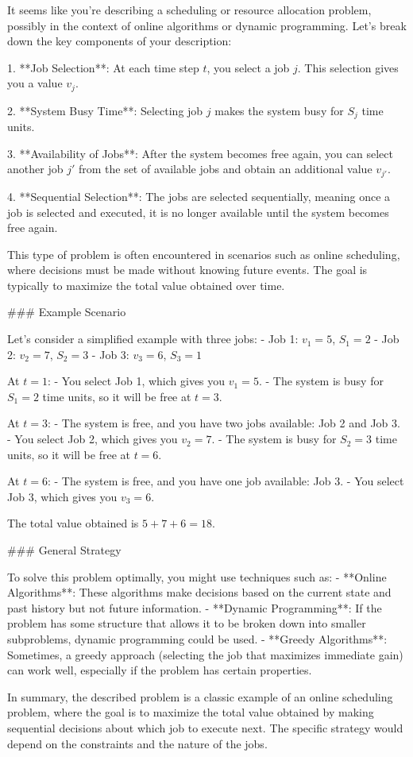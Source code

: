 It seems like you're describing a scheduling or resource allocation problem, possibly in the context of online algorithms or dynamic programming. Let's break down the key components of your description:

1. **Job Selection**: At each time step \( t \), you select a job \( j \). This selection gives you a value \( v_j \).

2. **System Busy Time**: Selecting job \( j \) makes the system busy for \( S_j \) time units.

3. **Availability of Jobs**: After the system becomes free again, you can select another job \( j' \) from the set of available jobs and obtain an additional value \( v_{j'} \).

4. **Sequential Selection**: The jobs are selected sequentially, meaning once a job is selected and executed, it is no longer available until the system becomes free again.

This type of problem is often encountered in scenarios such as online scheduling, where decisions must be made without knowing future events. The goal is typically to maximize the total value obtained over time.

### Example Scenario

Let's consider a simplified example with three jobs:
- Job 1: \( v_1 = 5 \), \( S_1 = 2 \)
- Job 2: \( v_2 = 7 \), \( S_2 = 3 \)
- Job 3: \( v_3 = 6 \), \( S_3 = 1 \)

At \( t = 1 \):
- You select Job 1, which gives you \( v_1 = 5 \).
- The system is busy for \( S_1 = 2 \) time units, so it will be free at \( t = 3 \).

At \( t = 3 \):
- The system is free, and you have two jobs available: Job 2 and Job 3.
- You select Job 2, which gives you \( v_2 = 7 \).
- The system is busy for \( S_2 = 3 \) time units, so it will be free at \( t = 6 \).

At \( t = 6 \):
- The system is free, and you have one job available: Job 3.
- You select Job 3, which gives you \( v_3 = 6 \).

The total value obtained is \( 5 + 7 + 6 = 18 \).

### General Strategy

To solve this problem optimally, you might use techniques such as:
- **Online Algorithms**: These algorithms make decisions based on the current state and past history but not future information.
- **Dynamic Programming**: If the problem has some structure that allows it to be broken down into smaller subproblems, dynamic programming could be used.
- **Greedy Algorithms**: Sometimes, a greedy approach (selecting the job that maximizes immediate gain) can work well, especially if the problem has certain properties.

In summary, the described problem is a classic example of an online scheduling problem, where the goal is to maximize the total value obtained by making sequential decisions about which job to execute next. The specific strategy would depend on the constraints and the nature of the jobs.